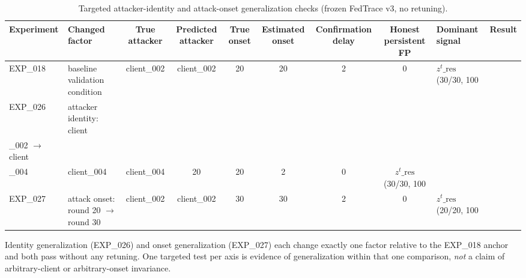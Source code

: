 \begin{table}[t]
\centering
\caption{Targeted attacker-identity and attack-onset generalization checks (frozen FedTrace v3, no retuning).}
\label{tab:generalization}
\begin{tabular}{llccccccll}
\toprule
Experiment & Changed factor & True attacker & Predicted attacker & True onset & Estimated onset & Confirmation delay & Honest persistent FP & Dominant signal & Result \\
\midrule
EXP\_018 & baseline validation condition & client\_002 & client\_002 & 20 & 20 & 2 & 0 & $z^t\_{\mathrm{res}}$ (30/30, 100\\%
EXP\_026 & attacker identity: client\\_002 $\to$ client\\_004 & client\_004 & client\_004 & 20 & 20 & 2 & 0 & $z^t\_{\mathrm{res}}$ (30/30, 100\\%
EXP\_027 & attack onset: round 20 $\to$ round 30 & client\_002 & client\_002 & 30 & 30 & 2 & 0 & $z^t\_{\mathrm{res}}$ (20/20, 100\\%
\bottomrule
\end{tabular}
\vspace{2pt}\par\raggedright\footnotesize Identity generalization (EXP\_026) and onset generalization (EXP\_027) each change exactly one factor relative to the EXP\_018 anchor and both pass without any retuning. One targeted test per axis is evidence of generalization within that one comparison, \emph{not} a claim of arbitrary-client or arbitrary-onset invariance.
\end{table}
